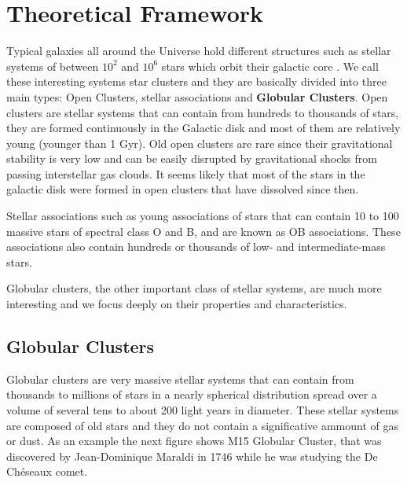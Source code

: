 \chapter{Theoretical Framework}

Typical galaxies all around the Universe hold different structures such as stellar systems of between $ 10^{2} $ and $ 10^{6} $ stars which orbit their galactic core . We call these interesting systems star clusters and they are basically divided into three main types: Open Clusters, stellar associations and \textbf{Globular Clusters}. Open clusters are stellar systems that can contain from hundreds to thousands of stars, they are formed continuously in the Galactic disk and most of them are relatively young (younger than 1 Gyr). Old open clusters are rare since their gravitational stability is very low and can be easily disrupted by gravitational shocks from passing interstellar gas clouds. It seems likely that most of the stars in the galactic disk were formed in open clusters that have dissolved since then. 

Stellar associations such as young associations of stars that can contain 10 to 100 massive stars of spectral class O and B, and are known as OB associations. These associations also contain hundreds or thousands of low- and intermediate-mass stars.

Globular clusters, the other important class of stellar systems, are much more interesting and we focus deeply on their properties and characteristics.  

\section{Globular Clusters}
 
Globular clusters are very massive stellar systems that can contain from thousands to millions of stars in a nearly spherical distribution spread over a volume of several tens to about 200 light years in diameter. These stellar systems are composed of old stars and they do not contain a significative ammount of gas or dust. As an example the next figure shows M15 Globular Cluster, that was discovered by Jean-Dominique Maraldi in 1746 while he was studying the De Chéseaux comet.

